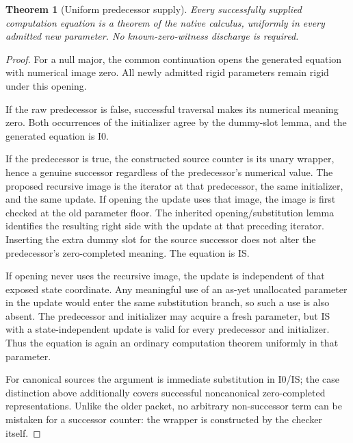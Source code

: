 \documentclass[11pt,letterpaper]{article}
\newtheorem{theorem}{Theorem}[section]
\theoremstyle{definition}\newtheorem{definition}[theorem]{Definition}
\theoremstyle{remark}\newtheorem{remark}[theorem]{Remark}
\begin{document}
\begin{theorem}[Uniform predecessor supply]
\label{up:uniform-supply}
Every successfully supplied computation equation is a theorem of the
native calculus, uniformly in every admitted new parameter. No
known-zero-witness discharge is required.
\end{theorem}
\begin{proof}
For a null major, the common continuation opens the generated equation
with numerical image zero. All newly admitted rigid parameters remain
rigid under this opening.

If the raw predecessor is false, successful traversal makes its numerical
meaning zero. Both occurrences of the initializer agree by the dummy-slot
lemma, and the generated equation is I0.

If the predecessor is true, the constructed source counter is its unary
wrapper, hence a genuine successor regardless of the predecessor's
numerical value. The proposed recursive image is the iterator at that
predecessor, the same initializer, and the same update.
If opening the update uses that image, the image is first checked at the
old parameter floor. The inherited opening/substitution lemma identifies
the resulting right side with the update at that preceding iterator.
Inserting the extra dummy slot for the source successor does not alter
the predecessor's zero-completed meaning. The equation is IS.

If opening never uses the recursive image, the update is independent of
that exposed state coordinate. Any meaningful use of an as-yet
unallocated parameter in the update would enter the same substitution
branch, so such a use is also absent. The predecessor and initializer
may acquire a fresh parameter, but IS with a state-independent update is
valid for every predecessor and initializer. Thus the equation is again
an ordinary computation theorem uniformly in that parameter.

For canonical sources the argument is immediate substitution in I0/IS;
the case distinction above additionally covers successful noncanonical
zero-completed representations. Unlike the older packet, no arbitrary
non-successor term can be mistaken for a successor counter: the wrapper
is constructed by the checker itself.
\end{proof}
\end{document}
